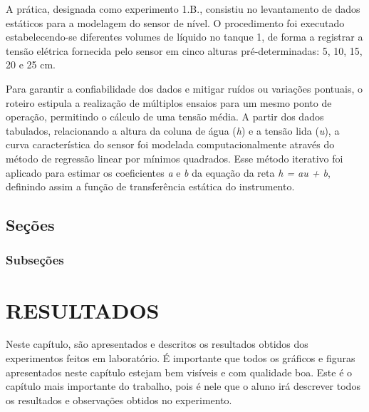 \documentclass[a4paper,12pt]{article}
\begin{document}
\begin{flushleft}
    \hspace{4ex}A prática, designada como experimento 1.B., consistiu no levantamento de dados estáticos para a modelagem do sensor de nível. O procedimento foi executado estabelecendo-se diferentes volumes de líquido no tanque 1, de forma a registrar a tensão elétrica fornecida pelo sensor em cinco alturas pré-determinadas: 5, 10, 15, 20 e 25 cm.
\end{flushleft}

\begin{flushleft}
    \hspace{4ex}Para garantir a confiabilidade dos dados e mitigar ruídos ou variações pontuais, o roteiro estipula a realização de múltiplos ensaios para um mesmo ponto de operação, permitindo o cálculo de uma tensão média. A partir dos dados tabulados, relacionando a altura da coluna de água (\textit{h}) e a tensão lida (\textit{u}), a curva característica do sensor foi modelada computacionalmente através do método de regressão linear por mínimos quadrados. Esse método iterativo foi aplicado para estimar os coeficientes \textit{a} e \textit{b} da equação da reta \textit{h = au + b}, definindo assim a função de transferência estática do instrumento.
\end{flushleft}


\subsection{Seções}

\subsubsection{Subseções}

\newpage


\thispagestyle{main}

\section{RESULTADOS}


\hspace{4ex}Neste capítulo, são apresentados e descritos os resultados obtidos dos experimentos feitos em laboratório. É importante que todos os gráficos e figuras apresentados neste capítulo estejam bem visíveis e com qualidade boa. Este é o capítulo mais importante do trabalho, pois é nele que o aluno irá descrever todos os resultados e observações obtidos no experimento.
\end{document}
